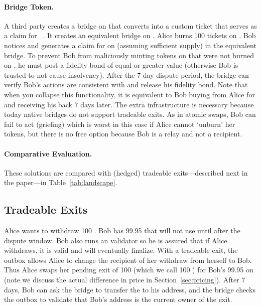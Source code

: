 \paragraph{Bridge Token.} A third party creates a bridge on \layertwo that converts \ethtwo into a custom ticket that serves as a claim for \ethtwo~\cite{Whi21}. It creates an equivalent bridge on \layerone. Alice burns 100 tickets on \layertwo. Bob notices and generates a claim for \ethone on \layerone (assuming sufficient supply) in the equivalent \layerone bridge. To prevent Bob from maliciously minting tokens on \layerone that were not burned on \layertwo, he must post a fidelity bond of equal or greater value (otherwise Bob is trusted to not cause insolvency). After the 7 day dispute period, the \layerone bridge can verify Bob's actions are consistent with \layertwo and release his fidelity bond. Note that when you collapse this functionality, it is equivalent to Bob buying \ethxx from Alice for \ethone and receiving his \ethone back 7 days later. The extra infrastructure is necessary because today native bridges do not support tradeable exits. As in atomic swaps, Bob can fail to act (griefing) which is worst in this case if Alice cannot `unburn' her tokens, but there is no free option because Bob is a relay and not a recipient. 

\paragraph{Comparative Evaluation.} These solutions are compared with (hedged) tradeable exits---described next in the paper---in Table~\ref{tab:landscape}.
 

\subsection{Tradeable Exits} 
\label{sec:tradeablexits}

Alice wants to withdraw 100 \ethtwo. Bob has 99.95 \ethone that will not use until after the dispute window. Bob also runs an \layertwo validator so he is assured that if Alice withdraws, it is valid and will eventually finalize. With a tradeable exit, the outbox allows Alice to change the recipient of her withdraw from herself to Bob. Thus Alice swaps her pending exit of 100 \ethone (which we call 100 \ethxx) for Bob's 99.95 \ethone on \layerone (note we discuss the actual difference in price in Section~\ref{sec:pricing}). After 7 days, Bob can ask the bridge to transfer the \ethone to his address, and the bridge checks the outbox to validate that Bob's address is the current owner of the exit.

